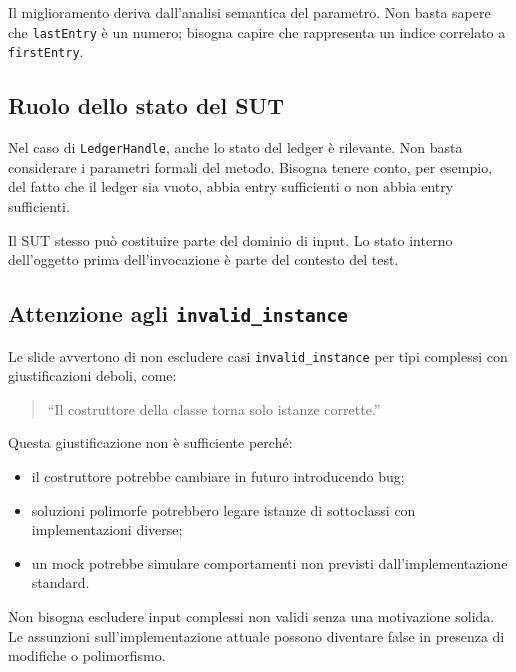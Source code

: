 \begin{notaprof}
Il miglioramento deriva dall'analisi semantica del parametro. Non basta sapere che \texttt{lastEntry} è un numero; bisogna capire che rappresenta un indice correlato a \texttt{firstEntry}.
\end{notaprof}

\subsection{Ruolo dello stato del SUT}

Nel caso di \texttt{LedgerHandle}, anche lo stato del ledger è rilevante. Non basta considerare i parametri formali del metodo. Bisogna tenere conto, per esempio, del fatto che il ledger sia vuoto, abbia entry sufficienti o non abbia entry sufficienti.

\begin{notaesame}
Il SUT stesso può costituire parte del dominio di input. Lo stato interno dell'oggetto prima dell'invocazione è parte del contesto del test.
\end{notaesame}

\subsection{Attenzione agli \texttt{invalid\_instance}}

Le slide avvertono di non escludere casi \texttt{invalid\_instance} per tipi complessi con giustificazioni deboli, come:

\begin{quote}
``Il costruttore della classe torna solo istanze corrette.''
\end{quote}

Questa giustificazione non è sufficiente perché:

\begin{itemize}
    \item il costruttore potrebbe cambiare in futuro introducendo bug;
    \item soluzioni polimorfe potrebbero legare istanze di sottoclassi con implementazioni diverse;
    \item un mock potrebbe simulare comportamenti non previsti dall'implementazione standard.
\end{itemize}

\begin{notaesame}
Non bisogna escludere input complessi non validi senza una motivazione solida. Le assunzioni sull'implementazione attuale possono diventare false in presenza di modifiche o polimorfismo.
\end{notaesame}

